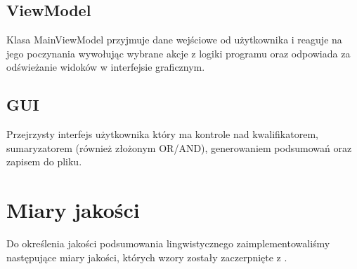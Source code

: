 \documentclass{classrep}
\begin{document}
\subsection{ViewModel}
Klasa MainViewModel przyjmuje dane wejściowe od użytkownika i reaguje na jego poczynania wywołując wybrane akcje z logiki programu oraz odpowiada za odświeżanie widoków w interfejsie graficznym.
\subsection{GUI}
Przejrzysty interfejs użytkownika który ma kontrole nad kwalifikatorem, sumaryzatorem (również złożonym OR/AND), generowaniem podsumowań oraz zapisem do pliku.

\section{Miary jakości}
Do określenia jakości podsumowania lingwistycznego zaimplementowaliśmy następujące miary jakości, których wzory zostały zaczerpnięte z \cite{adam}.
\end{document}
